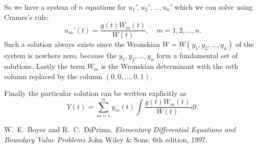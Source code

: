 \documentclass[12pt]{article}
\begin{document}
So we have a system of $n$ equations for $u_1',u_2',\ldots,u_n'$ which
we can solve using Cramer's rule:
\begin{equation*}
 u_m'(t) = \frac{g(t) W_m(t)}{W(t)}, \quad m=1,2,\ldots,n .
\end{equation*}
Such a solution always exists since the Wronskian $W=W(y_1,y_2,\ldots,y_n)$
of the system is nowhere zero, because the $y_1,y_2,\ldots,y_n$ form a
fundamental set of solutions. Lastly the term $W_m$ is the Wronskian
determinant with the $m$th column replaced by the column
$(0,0,\ldots,0,1)$.

Finally the particular solution can be written explicitly as
\begin{equation*}
 Y(t) = \sum_{m=1}^n y_m(t) \int \frac{g(t) W_m(t)}{W(t)} dt .
\end{equation*}

\begin{thebibliography}{1}

 W.~E.~Boyce and R.~C.~DiPrima.
 \textit{Elementary Differential Equations and Boundary Value Problems}
 John Wiley \& Sons, 6th edition, 1997.

\end{thebibliography}
\end{document}
